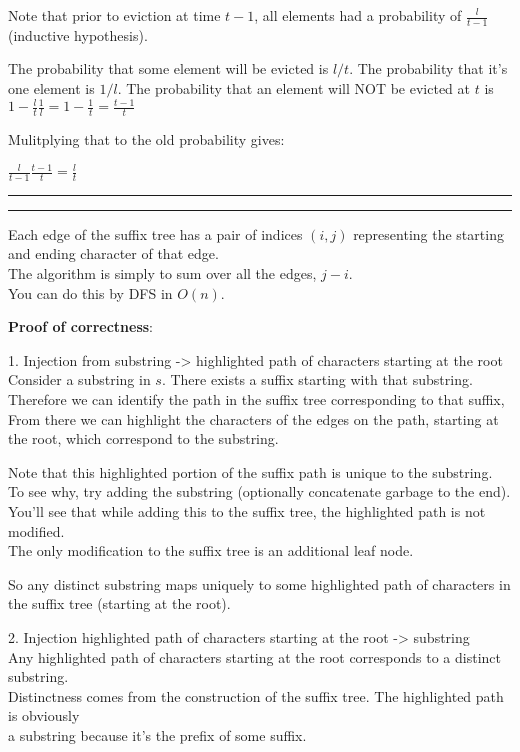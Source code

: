 \documentclass[11pt]{article}
\newcommand{\question}[2] {\vspace{.25in} \hrule\vspace{0.5em}
\noindent{\bf #1: #2} \vspace{0.5em}
\hrule \vspace{.10in}}
\begin{document}
Note that prior to eviction at time $t-1$, all elements had a probability of $\frac{l}{t-1}$ (inductive hypothesis).


The probability that some element will be evicted is $l/t$.
The probability that it's one element is $1/l$.
The probability that an element will NOT be evicted at $t$ is $1 - \frac{l}{t} \frac{1}{l} = 1 - \frac{1}{t} = \frac{t-1}{t}$

Mulitplying that to the old probability gives:

$\frac{l}{t-1} \frac{t-1}{t}  = \frac{l}{t}$



\question{2}{Counting Substrings}

Each edge of the suffix tree has a pair of indices $(i,j)$ representing the starting and ending character of that edge.\\
The algorithm is simply to sum over all the edges, $j-i$.\\
You can do this by DFS in $O(n)$.

\textbf{Proof of correctness}:

1. Injection from substring -> highlighted path of characters starting at the root\\
Consider a substring in $s$. There exists a suffix starting with that substring.\\
Therefore we can identify the path in the suffix tree corresponding to that suffix,\\
From there we can highlight the characters of the edges on the path, starting at the root, which correspond to the substring.

Note that this highlighted portion of the suffix path is unique to the substring.\\
To see why, try adding the substring (optionally concatenate garbage to the end).\\
You'll see that while adding this to the suffix tree, the highlighted path is not modified.\\
The only modification to the suffix tree is an additional leaf node.

So any distinct substring maps uniquely to some highlighted path of characters in the suffix tree (starting at the root).


2. Injection highlighted path of characters starting at the root -> substring\\
Any highlighted path of characters starting at the root corresponds to a distinct substring.\\
Distinctness comes from the construction of the suffix tree. The highlighted path is obviously\\
a substring because it's the prefix of some suffix.
\end{document}
